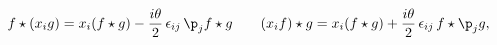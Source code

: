 \begin{equation}
     f\star(x_{i}g)
     =
     x_{i}(f\star g)-\frac{i\theta}{2}\,\epsilon_{ij}\,\p_{j}f\star g
     \qquad
     (x_{i}f)\star g
     =
     x_{i}(f\star g)+\frac{i\theta}{2}\,\epsilon_{ij}\,f\star \p_{j}g,
     \label{xrel}
\end{equation}

